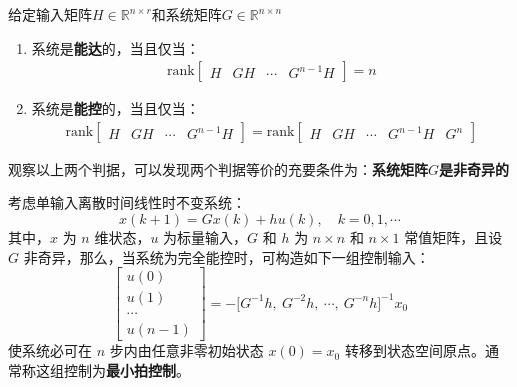 \begin{anymark}[能控性和能达性的秩判据]
    给定输入矩阵$H \in \mathbb{R}^{n \times r }$和系统矩阵$G \in \mathbb{R}^{n\times n}$
    \begin{enumerate}
        \item 系统是\textbf{能达}的，当且仅当：
        \begin{gather*}
            \text{rank} \begin{bmatrix}
                H & GH & \cdots & G^{n-1} H
            \end{bmatrix} = n
        \end{gather*}
        \item 系统是\textbf{能控}的，当且仅当：
        \begin{gather*}
            \text{rank} \begin{bmatrix}
                H & GH & \cdots & G^{n-1} H
            \end{bmatrix} = \text{rank} \begin{bmatrix}
                H & GH & \cdots & G^{n-1} H & G^n
            \end{bmatrix}
        \end{gather*}
    \end{enumerate}
    观察以上两个判据，可以发现两个判据等价的充要条件为：\textbf{系统矩阵$G$是非奇异的}
\end{anymark}

\begin{theorem}[最小拍控制]
    考虑单输入离散时间线性时不变系统：
    \begin{equation*}
        x(k+1) = Gx(k) + hu(k), \quad k = 0, 1, \cdots
    \end{equation*}
    其中，$x$ 为 $n$ 维状态，$u$ 为标量输入，$G$ 和 $h$ 为 $n \times n$ 和 $n \times 1$ 常值矩阵，且设 $G$ 非奇异，那么，当系统为完全能控时，可构造如下一组控制输入：
    \begin{equation*}
        \begin{bmatrix}
        u(0) \\ u(1) \\ \cdots \\ u(n-1)
        \end{bmatrix}
        = -\bigl[ G^{-1}h,\ G^{-2}h,\ \cdots,\ G^{-n}h \bigr]^{-1} x_0
    \end{equation*}
    使系统必可在 $n$ 步内由任意非零初始状态 $x(0) = x_0$ 转移到状态空间原点。通常称这组控制为\textbf{最小拍控制}。
\end{theorem}


